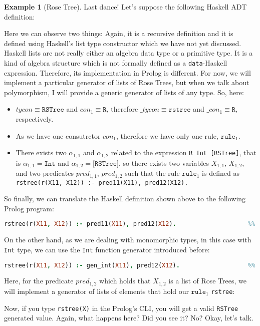 \documentclass{report}
\theoremstyle{definition}
\newtheorem{example}{Example}[section]
\theoremstyle{definition}
\newcommand{\ttt}[1]{\texttt{#1}}
\begin{document}
\begin{example}[Rose Tree]
	Last dance! Let's suppose the following Haskell ADT definition:
	
	Here we can observe two things: Again, it is a recursive definition and it is defined using Haskell's list type constructor which we have not yet discussed. \\
					
	Haskell lists are not really either an algebra data type or a primitive type. It is a kind of algebra structure which is not formally defined as a \ttt{data}-Haskell expression. Therefore, its implementation in Prolog is different. For now, we will implement a particular generator of lists of Rose Trees, but when we talk about polymorphism, I will provide a generic generator of lists of any type. So, here:
	\begin{itemize}
		\item $tycon \equiv \ttt{RSTree}$ and $con_1 \equiv \ttt{R}$, therefore $\_tycon \equiv \ttt{rstree}$ and $\_con_1 \equiv \ttt{R}$, respectively.
		\item As we have one consutrctor $con_1$, therefore we have only one rule, $\ttt{rule}_1$.
		\item There exists two $\alpha_{1,1}$ and $\alpha_{1,2}$ related to the expression \ttt{R Int [RSTree]}, that is $\alpha_{1,1} = \ttt{Int}$ and $\alpha_{1,2} = \ttt{[RSTree]}$, so there exists two variables $X_{1,1}$, $X_{1,2}$, and two predicates $pred_{1,1}$, $pred_{1,2}$ such that the rule $\ttt{rule}_1$ is defined as \\ \ttt{rstree(r(X11, X12)) :- pred11(X11), pred12(X12).}
	\end{itemize}
	So finally, we can translate the Haskell definition shown above to the following Prolog program:\\
	\begin{lstlisting}[language=Prolog]
rstree(r(X11, X12)) :- pred11(X11), pred12(X12).					%% rule 1
	\end{lstlisting}
	On the other hand, as we are dealing with monomorphic types, in this case with \ttt{Int} type, we can use the \ttt{Int} function generator introduced before:\\
	\begin{lstlisting}[language=Prolog]
rstree(r(X11, X12)) :- gen_int(X11), pred12(X12).					%% rule 1
	\end{lstlisting}
	Here, for the predicate $pred_{1,2}$ which holds that $X_{1,2}$ is a list of Rose Trees, we will implement a generator of lists of elements that hold our $\ttt{rule}_1$ \ttt{rstree}:
	
	Now, if you type \ttt{rstree(X)} in the Prolog's CLI, you will get a valid \ttt{RSTree} generated value. Again, what happens here? Did you see it? No? Okay, let's talk.\\
\end{example}
\end{document}
